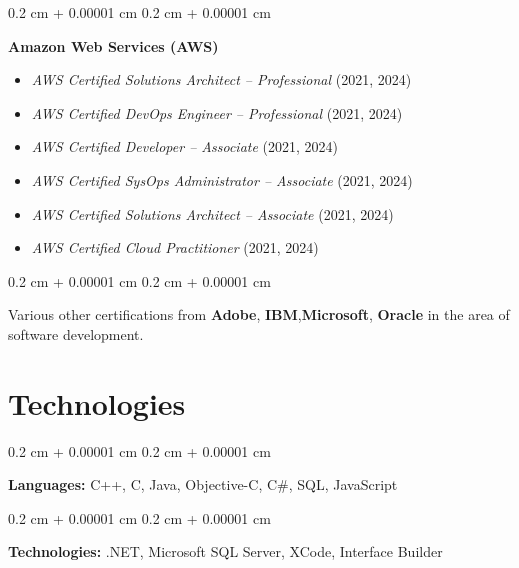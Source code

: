 \documentclass[10pt, a4paper]{article}
\newenvironment{onecolentry}{
    \begin{adjustwidth}{
        0.2 cm + 0.00001 cm
    }{
        0.2 cm + 0.00001 cm
    }
}{
    \end{adjustwidth}
} %
\begin{document}
\begin{onecolentry}
    \textbf{Amazon Web Services (AWS)}
    \begin{itemize}[leftmargin=0.5cm, topsep=0.0cm, itemsep=0.02cm]
        \item \textit{AWS Certified Solutions Architect – Professional} (2021, 2024)
        \item \textit{AWS Certified DevOps Engineer – Professional} (2021, 2024)
        \item \textit{AWS Certified Developer – Associate} (2021, 2024)
        \item \textit{AWS Certified SysOps Administrator – Associate} (2021, 2024)
        \item \textit{AWS Certified Solutions Architect – Associate} (2021, 2024)
        \item \textit{AWS Certified Cloud Practitioner} (2021, 2024)
    \end{itemize}
\end{onecolentry}

\vspace{0.10 cm}

\begin{onecolentry}
    Various other certifications from \textbf{Adobe}, \textbf{IBM},\textbf{Microsoft}, \textbf{Oracle} in the area of software development.
\end{onecolentry}

\vspace{0.20 cm}


\section{Technologies}




\begin{onecolentry}
    \textbf{Languages:} C++, C, Java, Objective-C, C\#, SQL, JavaScript
\end{onecolentry}

\vspace{0.2 cm}

\begin{onecolentry}
    \textbf{Technologies:} .NET, Microsoft SQL Server, XCode, Interface Builder
\end{onecolentry}
\end{document}
